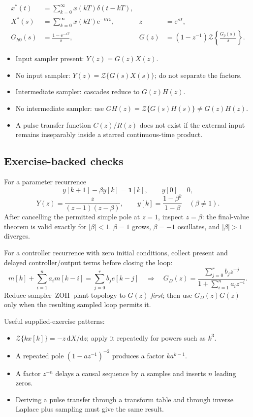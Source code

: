 \documentclass[10pt]{article}
\newcommand{\Z}{\mathcal{Z}}
\newcommand{\e}{\mathrm{e}}
\newcommand{\unitstep}{\mathbf{1}}
\begin{document}
\begin{align*}
x^*(t)&=\sum_{k=0}^{\infty}x(kT)\delta(t-kT),\\
X^*(s)&=\sum_{k=0}^{\infty}x(kT)\e^{-kTs},
&z&=\e^{sT},\\
G_{h0}(s)&=\frac{1-\e^{-sT}}{s},
&G(z)&=(1-z^{-1})\Z\!\left\{\frac{G_p(s)}{s}\right\}.
\end{align*}

\begin{itemize}
  \item Input sampler present: $Y(z)=G(z)X(z)$.
  \item No input sampler: $Y(z)=\Z\{G(s)X(s)\}$; do not separate the factors.
  \item Intermediate sampler: cascades reduce to $G(z)H(z)$.
  \item No intermediate sampler: use $GH(z)=\Z\{G(s)H(s)\}\ne G(z)H(z)$.
  \item A pulse transfer function $C(z)/R(z)$ does not exist if the external input remains inseparably inside a starred continuous-time product.
\end{itemize}

\subsection{Exercise-backed checks}

For a parameter recurrence
\[
y[k+1]-\beta y[k]=\unitstep[k],\qquad y[0]=0,
\]
\[
Y(z)=\frac{z}{(z-1)(z-\beta)},\qquad
y[k]=\frac{1-\beta^k}{1-\beta}\quad(\beta\ne1).
\]
After cancelling the permitted simple pole at $z=1$, inspect $z=\beta$: the final-value theorem is valid exactly for $|\beta|<1$.  $\beta=1$ grows, $\beta=-1$ oscillates, and $|\beta|>1$ diverges.

For a controller recurrence with zero initial conditions, collect present and delayed controller/output terms before closing the loop:
\[
m[k]+\sum_{i=1}^{n}a_im[k-i]=\sum_{j=0}^{r}b_je[k-j]
\quad\Longrightarrow\quad
G_D(z)=\frac{\sum_{j=0}^{r}b_jz^{-j}}{1+\sum_{i=1}^{n}a_iz^{-i}}.
\]
Reduce sampler--ZOH--plant topology to $G(z)$ \emph{first}; then use $G_D(z)G(z)$ only when the resulting sampled loop permits it.

Useful supplied-exercise patterns:
\begin{itemize}
  \item $\Z\{kx[k]\}=-z\,\mathrm{d}X/\mathrm{d}z$; apply it repeatedly for powers such as $k^3$.
  \item A repeated pole $(1-az^{-1})^{-2}$ produces a factor $k a^{k-1}$.
  \item A factor $z^{-n}$ delays a causal sequence by $n$ samples and inserts $n$ leading zeros.
  \item Deriving a pulse transfer through a transform table and through inverse Laplace plus sampling must give the same result.
\end{itemize}
\end{document}
